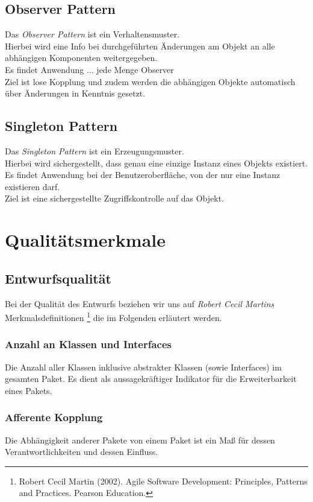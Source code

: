 \documentclass[10pt]{scrreprt}
\begin{document}
\section{Observer Pattern}
Das \textit{Observer Pattern} ist ein Verhaltensmuster. \\ Hierbei wird eine Info bei durchgeführten Änderungen am Objekt an alle abhängigen Komponenten weitergegeben. \\ Es findet Anwendung ... jede Menge Observer \\ Ziel ist lose Kopplung und zudem werden die abhängigen Objekte automatisch über Änderungen in Kenntnis gesetzt.

\section{Singleton Pattern}
Das \textit{Singleton Pattern} ist ein Erzeugungsmuster. \\ Hierbei wird sichergestellt, dass genau eine einzige Instanz eines Objekts existiert. \\ Es findet Anwendung bei der Benutzeroberfläche, von der nur eine Instanz existieren darf. \\ Ziel ist eine sichergestellte Zugriffskontrolle auf das Objekt. 




\chapter{Qualitätsmerkmale}
\section{Entwurfsqualität}
Bei der Qualität des Entwurfs beziehen wir uns auf \textit{Robert Cecil Martins} Merkmalsdefinitionen \footnote{Robert Cecil Martin (2002). Agile Software Development: Principles, Patterns and Practices. Pearson Education.} die im Folgenden erläutert werden.

\subsection*{Anzahl an Klassen und Interfaces}
Die Anzahl aller Klassen inklusive abstrakter Klassen (sowie Interfaces) im gesamten Paket. Es dient als aussagekräftiger Indikator für die Erweiterbarkeit eines Pakets.

\subsection*{Afferente Kopplung}
Die Abhängigkeit anderer Pakete von einem Paket ist ein Maß für dessen Verantwortlichkeiten und dessen Einfluss.
\end{document}
